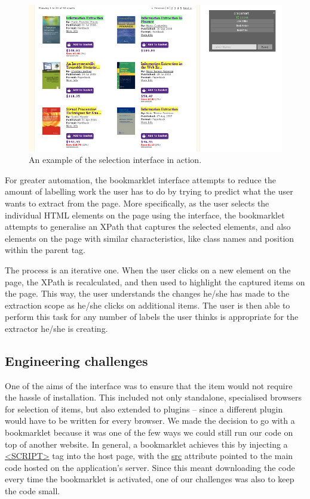 \begin{figure}[htbp]
\centering
\includegraphics[scale=0.43]{selection_example.png} 
\caption{An example of the selection interface in action.}
\label{fig:selection_example}
\end{figure}


For greater automation, the bookmarklet interface attempts to reduce the amount of labelling work the user has to do by trying to predict what the user wants to extract from the page. More specifically, as the user selects the individual HTML elements on the page using the interface, the bookmarklet attempts to generalise an XPath that captures the selected elements, and also elements on the page with similar characteristics, like class names and position within the parent tag.


The process is an iterative one. When the user clicks on a new element on the page, the XPath is recalculated, and then used to highlight the captured items on the page. This way, the user understands the changes he/she has made to the extraction scope as he/she clicks on additional items. The user is then able to perform this task for any number of labels the user thinks is appropriate for the extractor he/she is creating.

\subsection{Engineering challenges}

One of the aims of the interface was to ensure that the item would not require the hassle of installation. This included not only standalone, specialised browsers for selection of items, but also extended to plugins -- since a different plugin would have to be written for every browser. We made the decision to go with a bookmarklet because it was one of the few ways we could still run our code on top of another website. In general, a bookmarklet achieves this by injecting a \url{<SCRIPT>} tag into the host page, with the \url{src} attribute pointed to the main code hosted on the application's server. Since this meant downloading the code every time the bookmarklet is activated, one of our challenges was also to keep the code small.

